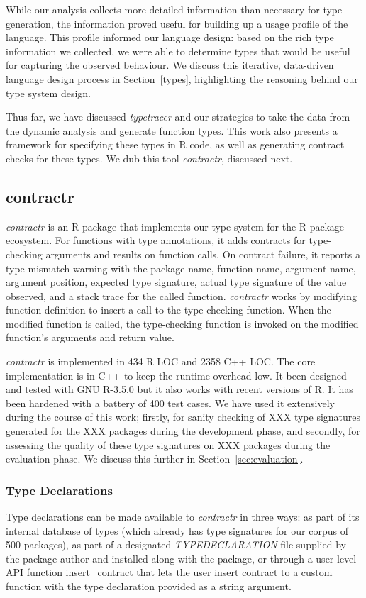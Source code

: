 \documentclass[acmsmall,review,anonymous]{acmart}\settopmatter{printfolios=true,printccs=false,printacmref=false}
\newcommand{\contractr}{\emph{contractr}\xspace} %
\newcommand{\typetracer}{\emph{typetracer}\xspace} %
\begin{document}
While our analysis collects more detailed information than necessary for type generation, the information proved useful for building up a usage profile of the language. 
This profile informed our language design: based on the rich type information we collected, we were able to determine types that would be useful for capturing the observed behaviour.
We discuss this iterative, data-driven language design process in Section~\ref{types}, highlighting the reasoning behind our type system design.

Thus far, we have discussed \typetracer and our strategies to take the data from the dynamic analysis and generate function types.
This work also presents a framework for specifying these types in R code, as well as generating contract checks for these types.
We dub this tool \contractr, discussed next.

%
%
%
%
\subsection{contractr}
\label{sec:contractr}

\contractr is an R package that implements our type system for the R
package ecosystem. For functions with type annotations, it adds contracts for type-checking
arguments and results on function calls. On contract failure, it reports a type
mismatch warning with the package name, function name, argument name, argument
position, expected type signature, actual type signature of the value observed,
and a stack trace for the called function. \contractr works by modifying
function definition to insert a call to the type-checking function. When the
modified function is called, the type-checking function is invoked on the
modified function's arguments and return value.

\contractr is implemented in 434 R LOC and 2358 C++ LOC. The core
implementation is in C++ to keep the runtime overhead low. It been designed and
tested with GNU R-3.5.0 but it also works with recent versions of R. It has been
hardened with a battery of 400 test cases. We have used it extensively during
the course of this work; firstly, for sanity checking of XXX type signatures
generated for the XXX packages during the development phase, and secondly, for
assessing the quality of these type signatures on XXX packages during the
evaluation phase. We discuss this further in Section~\ref{sec:evaluation}.

%
%
\subsubsection{Type Declarations}
Type declarations can be made available to \contractr in three ways: as
part of its internal database of types (which already has type signatures for
our corpus of 500 packages), as part of a designated \emph{TYPEDECLARATION} file
supplied by the package author and installed along with the package, or through
a user-level API function insert\_contract that lets the user insert contract to
a custom function with the type declaration provided as a string argument.
\end{document}
